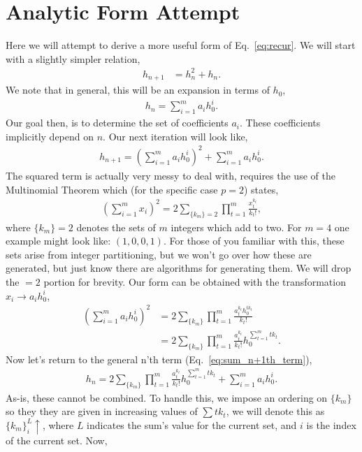 \documentclass[../../main.tex]{subfiles}
\begin{document}
		\section{Analytic Form Attempt}
			Here we will attempt to derive a more useful form of Eq.~\ref{eq:recur}. We will start with a slightly simpler relation,
			\begin{align}
				h_{n+1} &= h_n^2 + h_n.
			\end{align}
			We note that in general, this will be an expansion in terms of $h_0$,
			\begin{align}
				h_n = \sum_{i=1}^m a_i h_0^i.
			\end{align}
			Our goal then, is to determine the set of coefficients ${a_i}$. These coefficients implicitly depend on $n$. Our next iteration will look like,
			\begin{align}\label{eq:sum_n+1th_term}
				h_{n+1} = \left(\sum_{i=1}^m a_i h_0^i\right)^2 + \sum_{i=1}^m a_i h_0^i.
			\end{align}
			The squared term is actually very messy to deal with, requires the use of the Multinomial Theorem which (for the specific case $p=2$) states,
			\begin{align}
				\left(\sum_{i=1}^m x_i\right)^2 = 2\sum_{\{k_m\}=2} \prod_{t=1}^m \frac{x_t^{k_t}}{k_t!},
			\end{align}
			where $\{k_m\}=2$ denotes the sets of $m$ integers which add to two. For $m=4$ one example might look like: $(1, 0, 0, 1)$. For those of you familiar with this, these sets arise from integer partitioning, but we won't go over how these are generated, but just know there are algorithms for generating them. We will drop the $=2$ portion for brevity. Our form can be obtained with the transformation $x_i\to a_ih_0^i$,
			\begin{align}
				\left(\sum_{i=1}^m a_ih_0^i\right)^2 &= 2\sum_{\{k_m\}} \prod_{t=1}^m \frac{a_t^{k_t} h_0^{tk_t}}{k_t!} \\
				&= 2\sum_{\{k_m\}} \prod_{t=1}^m \frac{a_t^{k_t}}{k_t!} h_0^{\sum_{t=1}^m tk_t}.
			\end{align}
			Now let's return to the general n'th term (Eq.~\ref{eq:sum_n+1th_term}),
			\begin{align}
				h_n = 2\sum_{\{k_m\}} \prod_{t=1}^m \frac{a_t^{k_t}}{k_t!} h_0^{\sum_{t=1}^m tk_t} + \sum_{i=1}^m a_i h_0^i.
			\end{align}
			As-is, these cannot be combined. To handle this, we impose an ordering on $\{k_m\}$ so they they are given in increasing values of $\sum tk_t$, we will denote this as $\{k_m\}_i^{L}\uparrow$, where $L$ indicates the sum's value for the current set, and $i$ is the index of the current set. Now,
\end{document}

